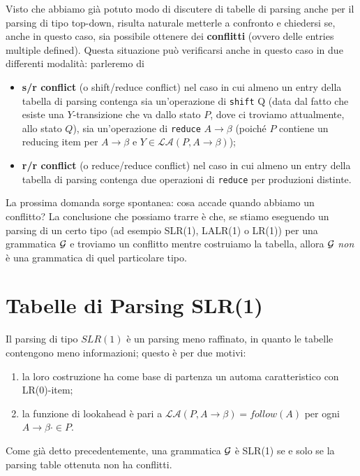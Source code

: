 \documentclass[class=book, crop=false, oneside, 12pt]{standalone}
\begin{document}
Visto che abbiamo già potuto modo di discutere di tabelle di parsing anche per il parsing di tipo top-down, risulta naturale metterle a confronto e chiedersi se, anche in questo caso, sia possibile ottenere dei \textbf{conflitti} (ovvero delle entries multiple defined). Questa situazione può verificarsi anche in questo caso in due differenti modalità: parleremo di
\begin{itemize}
    \item \textbf{s/r conflict} (o shift/reduce conflict) nel caso in cui almeno un entry della tabella di parsing contenga sia un'operazione di \texttt{shift} Q (data dal fatto che esiste una \(Y\)-transizione che va dallo stato \(P\), dove ci troviamo attualmente, allo stato \(Q\)), sia un'operazione di \texttt{reduce} \(A \rightarrow \beta\) (poiché \(P\) contiene un reducing item per \(A \rightarrow \beta\) e \(Y \in \mathcal{LA}(P, A \rightarrow \beta)\));
    \item \textbf{r/r conflict} (o reduce/reduce conflict) nel caso in cui almeno un entry della tabella di parsing contenga due operazioni di \texttt{reduce} per produzioni distinte.
\end{itemize}

La prossima domanda sorge spontanea: cosa accade quando abbiamo un conflitto? La conclusione che possiamo trarre è che, se stiamo eseguendo un parsing di un certo tipo (ad esempio SLR(1), LALR(1) o LR(1)) per una grammatica \(\mathcal{G}\) e troviamo un conflitto mentre costruiamo la tabella, allora \(\mathcal{G}\) \emph{non} è una grammatica di quel particolare tipo.
\section{Tabelle di Parsing SLR(1)}
Il parsing di tipo \(SLR(1)\) è un parsing meno raffinato, in quanto le tabelle contengono meno informazioni; questo è per due motivi:
\begin{enumerate}
    \item la loro costruzione ha come base di partenza un automa caratteristico con LR(0)-item;
    \item la funzione di lookahead è pari a \(\mathcal{LA}(P, A \rightarrow \beta) = follow(A)\) per ogni \(A \rightarrow \beta \cdot \in P\).
\end{enumerate}
Come già detto precedentemente, una grammatica \(\mathcal{G}\) è SLR(1) se e solo se la parsing table ottenuta non ha conflitti.
\end{document}
